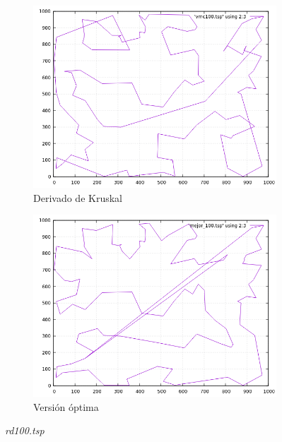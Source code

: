 \documentclass[12pt,spanish]{article}
\begin{document}
\begin{figure}[H]
\begin{subfigure}[b]{0.36\textwidth}
\includegraphics[width=\textwidth]{rd100_vmc.png}
\caption{Derivado de Kruskal}
\end{subfigure}
\quad
\begin{subfigure}[b]{0.36\textwidth}
\includegraphics[width=\textwidth]{rd100_mejor.png}
\caption{Versión óptima}
\end{subfigure}
\caption{\textit{rd100.tsp}}
\end{figure}
\end{document}
